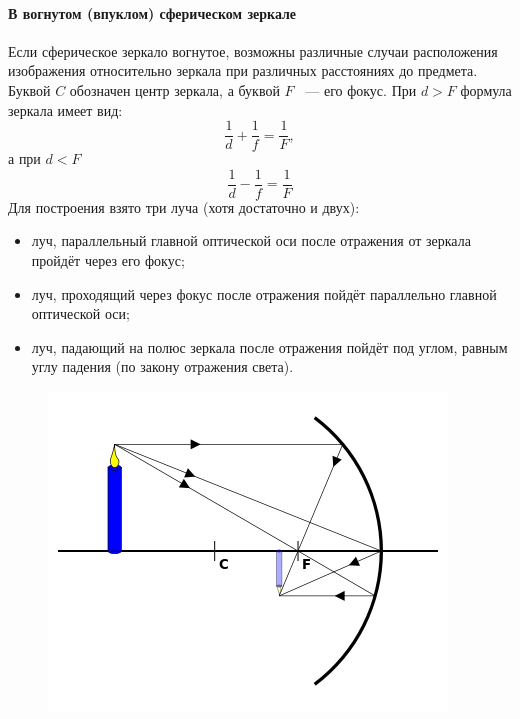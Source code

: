 \documentclass[11pt]{article}
\begin{document}
\begin{enumerate}
			\paragraph{В вогнутом (впуклом) сферическом зеркале}
			Если сферическое зеркало вогнутое, возможны различные случаи расположения изображения относительно зеркала при различных расстояниях до предмета. Буквой $C$ обозначен центр зеркала, а буквой $F$ ~--- его фокус. При $d>F$ формула зеркала имеет вид:
			$$
				\frac{1}{d} + \frac{1}{f} = \frac{1}{F},
			$$
			а при $d < F$
			$$
				\frac{1}{d} - \frac{1}{f} = \frac{1}{F}
			$$
			Для построения взято три луча (хотя достаточно и двух):
			\begin{itemize}
				\item луч, параллельный главной оптической оси после отражения от зеркала пройдёт через его фокус;
				\item луч, проходящий через фокус после отражения пойдёт параллельно главной оптической оси;
				\item луч, падающий на полюс зеркала после отражения пойдёт под углом, равным углу падения (по закону отражения света).
			\end{itemize}
			\begin{figure}[!ht]
					\includegraphics[width=\linewidth]{assets/mirrors/sphere_mirror1.png}
				\endminipage\hfill

\end{figure}
\end{enumerate}
\end{document}
